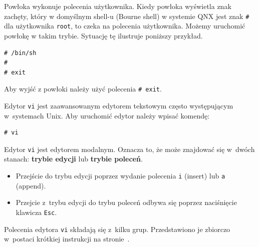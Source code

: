 \begin{example}\label{ex:prostakomenda6}


Powłoka wykonuje polecenia użytkownika. Kiedy powłoka wyświetla znak zachęty, który w domyślnym shell-u (Bourne shell) w systemie QNX jest znak \lstinline[style=MyBashStyle]{#} dla użytkownika \lstinline[style=MyBashStyle]{root}, to czeka na polecenia użytkownika. Możemy uruchomić powłokę w takim trybie. Sytuację tę ilustruje poniższy przykład.


\begin{lstlisting}[style=MyBashStyle]
# /bin/sh
#
# exit
\end{lstlisting}

Aby wyjść z powłoki należy użyć polecenia \lstinline[style=MyBashStyle]{# exit}.
\end{example}

\begin{example}\label{ex:vi}


Edytor \lstinline[style=MyBashStyle]{vi} jest zaawansowanym edytorem tekstowym często występującym w~systemach Unix. Aby uruchomić edytor należy wpisać komendę:

\begin{lstlisting}[style=MyBashStyle]
# vi
\end{lstlisting}

 Edytor \lstinline[style=MyBashStyle]{vi} jest edytorem modalnym. Oznacza to, że może znajdować się w~dwóch stanach: \textbf{trybie edycji} lub \textbf{trybie poleceń}.

\begin{itemize}
\item Przejście do trybu edycji poprzez wydanie polecenia \lstinline[style=MyBashStyle]{i} (insert) lub \lstinline[style=MyBashStyle]{a} (append).
\item Przejcie z~trybu edycji do trybu poleceń odbywa się poprzez naciśnięcie klawicza \lstinline[style=MyBashStyle]{Esc}.
\end{itemize}

Polecenia edytora \lstinline[style=MyBashStyle]{vi} składają się z~kilku grup. Przedstawiono je zbiorczo w~postaci krótkiej instrukcji na stronie~\pageref{viRef}.
\end{example}

\clearpage
{}
{\label{viRef}

}




